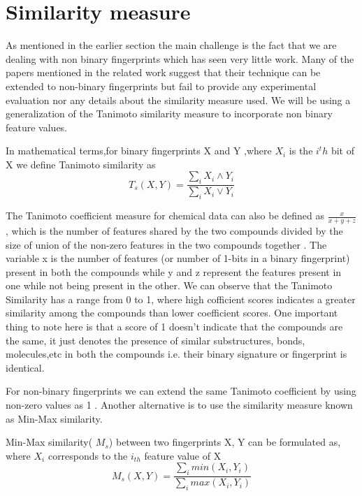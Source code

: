 \section{Similarity measure}

As mentioned in the earlier section the main challenge is the fact that we are dealing with non binary fingerprints which has seen very little work. Many of the papers mentioned in the related work suggest that their technique can be extended to non-binary fingerprints but fail to provide any experimental evaluation nor any details about the similarity measure used. We will be using a generalization of the Tanimoto similarity measure to incorporate non binary feature values. 

\begin{dfn}
In mathematical terms,for binary fingerprints X and Y ,where $X_i$ is the $i^th$ bit of X we define Tanimoto similarity as
\begin{equation}
\label{eq:tan}
T_s(X,Y) = \frac{\sum \limits_i X_i \wedge Y_i} {\sum \limits_i X_i \vee Y_i} 
\end{equation}
\end{dfn}

The Tanimoto coefficient measure for chemical data can also be defined  as $\frac{x}{x+y+z}$, which is the number of features shared by the two compounds divided by the size of union of the non-zero features in the two compounds together . The variable x is the number of features (or number of 1-bits in a binary fingerprint) present in both the compounds while y and z represent the features present in one while not being present in the other. We can observe that the Tanimoto Similarity has a range from 0 to 1, where high cofficient scores indicates a greater similarity among the compounds than lower coefficient scores. One important thing to note here is that a score of 1 doesn't indicate that the compounds are the same, it just denotes the presence of similar substructures, bonds, molecules,etc in both the compounds i.e. their binary signature or fingerprint is identical. 

For non-binary fingerprints we can extend the same Tanimoto coefficient by using non-zero values as 1 . Another alternative is to use the similarity measure known as Min-Max similarity. 

\begin{dfn}
Min-Max similarity( $M_s$) between two fingerprints X, Y can be formulated as, where $X_i$ corresponds to the $i_{th}$ feature value of X 
\begin{equation}
\label{eq:minmax}
 M_s(X,Y) = \frac{\sum \limits_{i} min(X_i, Y_i)}{\sum \limits_{i} max(X_i, Y_i)}
\end{equation}
\end{dfn}

